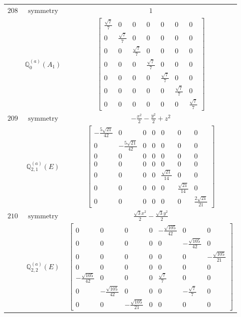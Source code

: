 \documentclass[fleqn,8pt,landscape]{jsarticle}
\begin{document}
\begin{longtable}{ccc}
$ 208 $ & $ \text{symmetry} $ & $ 1 $ \\
$  $ & $ \mathbb{Q}_{0}^{(a)}(A_{1}) $ & $ \begin{bmatrix} \frac{\sqrt{7}}{7} & 0 & 0 & 0 & 0 & 0 & 0 \\ 0 & \frac{\sqrt{7}}{7} & 0 & 0 & 0 & 0 & 0 \\ 0 & 0 & \frac{\sqrt{7}}{7} & 0 & 0 & 0 & 0 \\ 0 & 0 & 0 & \frac{\sqrt{7}}{7} & 0 & 0 & 0 \\ 0 & 0 & 0 & 0 & \frac{\sqrt{7}}{7} & 0 & 0 \\ 0 & 0 & 0 & 0 & 0 & \frac{\sqrt{7}}{7} & 0 \\ 0 & 0 & 0 & 0 & 0 & 0 & \frac{\sqrt{7}}{7} \end{bmatrix} $ \\ \hline
$ 209 $ & $ \text{symmetry} $ & $ - \frac{x^{2}}{2} - \frac{y^{2}}{2} + z^{2} $ \\
$  $ & $ \mathbb{Q}_{2,1}^{(a)}(E) $ & $ \begin{bmatrix} - \frac{5 \sqrt{21}}{42} & 0 & 0 & 0 & 0 & 0 & 0 \\ 0 & - \frac{5 \sqrt{21}}{42} & 0 & 0 & 0 & 0 & 0 \\ 0 & 0 & 0 & 0 & 0 & 0 & 0 \\ 0 & 0 & 0 & 0 & 0 & 0 & 0 \\ 0 & 0 & 0 & 0 & \frac{\sqrt{21}}{14} & 0 & 0 \\ 0 & 0 & 0 & 0 & 0 & \frac{\sqrt{21}}{14} & 0 \\ 0 & 0 & 0 & 0 & 0 & 0 & \frac{2 \sqrt{21}}{21} \end{bmatrix} $ \\ \hline
$ 210 $ & $ \text{symmetry} $ & $ \frac{\sqrt{3} x^{2}}{2} - \frac{\sqrt{3} y^{2}}{2} $ \\
$  $ & $ \mathbb{Q}_{2,2}^{(a)}(E) $ & $ \begin{bmatrix} 0 & 0 & 0 & 0 & - \frac{\sqrt{105}}{42} & 0 & 0 \\ 0 & 0 & 0 & 0 & 0 & - \frac{\sqrt{105}}{42} & 0 \\ 0 & 0 & 0 & 0 & 0 & 0 & - \frac{\sqrt{105}}{21} \\ 0 & 0 & 0 & 0 & 0 & 0 & 0 \\ - \frac{\sqrt{105}}{42} & 0 & 0 & 0 & \frac{\sqrt{7}}{7} & 0 & 0 \\ 0 & - \frac{\sqrt{105}}{42} & 0 & 0 & 0 & - \frac{\sqrt{7}}{7} & 0 \\ 0 & 0 & - \frac{\sqrt{105}}{21} & 0 & 0 & 0 & 0 \end{bmatrix} $ \\ \hline

\end{longtable}
\end{document}
